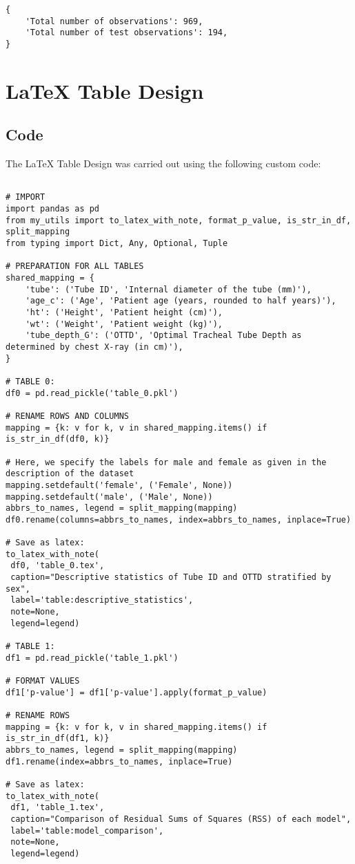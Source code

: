 \documentclass[11pt]{article}
\begin{document}
\begin{Verbatim}[tabsize=4]
{
    'Total number of observations': 969,
    'Total number of test observations': 194,
}
\end{Verbatim}

\section{LaTeX Table Design}
\subsection{{Code}}
The LaTeX Table Design was carried out using the following custom code:

\begin{verbatim}

# IMPORT
import pandas as pd
from my_utils import to_latex_with_note, format_p_value, is_str_in_df, split_mapping
from typing import Dict, Any, Optional, Tuple

# PREPARATION FOR ALL TABLES
shared_mapping = {
    'tube': ('Tube ID', 'Internal diameter of the tube (mm)'),
    'age_c': ('Age', 'Patient age (years, rounded to half years)'),
    'ht': ('Height', 'Patient height (cm)'),
    'wt': ('Weight', 'Patient weight (kg)'),
    'tube_depth_G': ('OTTD', 'Optimal Tracheal Tube Depth as determined by chest X-ray (in cm)'),
}

# TABLE 0:
df0 = pd.read_pickle('table_0.pkl')

# RENAME ROWS AND COLUMNS
mapping = {k: v for k, v in shared_mapping.items() if is_str_in_df(df0, k)}

# Here, we specify the labels for male and female as given in the description of the dataset
mapping.setdefault('female', ('Female', None)) 
mapping.setdefault('male', ('Male', None)) 
abbrs_to_names, legend = split_mapping(mapping)
df0.rename(columns=abbrs_to_names, index=abbrs_to_names, inplace=True)

# Save as latex:
to_latex_with_note(
 df0, 'table_0.tex',
 caption="Descriptive statistics of Tube ID and OTTD stratified by sex", 
 label='table:descriptive_statistics',
 note=None,
 legend=legend)

# TABLE 1:
df1 = pd.read_pickle('table_1.pkl')

# FORMAT VALUES
df1['p-value'] = df1['p-value'].apply(format_p_value)

# RENAME ROWS 
mapping = {k: v for k, v in shared_mapping.items() if is_str_in_df(df1, k)} 
abbrs_to_names, legend = split_mapping(mapping)
df1.rename(index=abbrs_to_names, inplace=True)

# Save as latex:
to_latex_with_note(
 df1, 'table_1.tex',
 caption="Comparison of Residual Sums of Squares (RSS) of each model", 
 label='table:model_comparison',
 note=None,
 legend=legend)

\end{verbatim}
\end{document}
